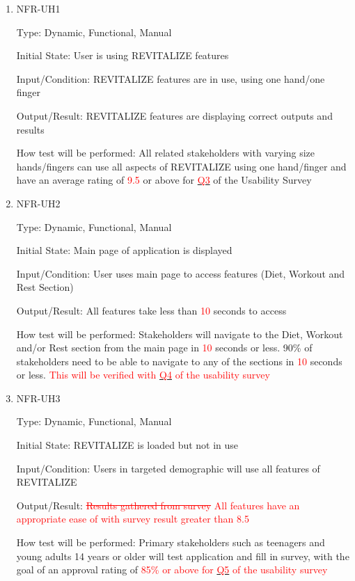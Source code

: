 \documentclass[12pt, titlepage]{article}
\begin{document}
\begin{enumerate}
	
	\item{NFR-UH1\\}
	
	Type: Dynamic, Functional, Manual
	
	Initial State: User is using REVITALIZE features
	
	Input/Condition: REVITALIZE features are in use, using one hand/one finger
	
	Output/Result: REVITALIZE features are displaying correct outputs and results
	
	How test will be performed: All related stakeholders with varying size hands/fingers can use all aspects of REVITALIZE using one hand/finger and have an average rating of \textcolor{red}{9.5} or above for \hyperlink{q3}{\textcolor{red}{Q3}} of the Usability Survey
	
	\item{NFR-UH2\\}
	
	Type: Dynamic, Functional, Manual
	
	Initial State: Main page of application is displayed
	
	Input/Condition: User uses main page to access features (Diet, Workout and Rest Section)
	
	Output/Result: All features take less than \textcolor{red}{10} seconds to access
	
	How test will be performed: Stakeholders will navigate to the Diet, Workout and/or Rest section from the main page in \textcolor{red}{10} seconds or less. 90\% of stakeholders need to be able to navigate to any of the sections in \textcolor{red}{10} seconds or less. \textcolor{red}{This will be verified with \hyperlink{q4}{\textcolor{red}{Q4}} of the usability survey}
	
	\item{NFR-UH3\\}
	
	Type: Dynamic, Functional, Manual
	
	Initial State: REVITALIZE is loaded but not in use
	
	Input/Condition: Users in targeted demographic will use all features of REVITALIZE
	
	Output/Result: \textcolor{red}{\sout{Results gathered from survey}} \textcolor{red}{All features have an appropriate ease of with survey result greater than 8.5}
	
	How test will be performed: Primary stakeholders such as teenagers and young adults 14 years or older will test application and fill in survey, with the goal of an approval rating of \textcolor{red}{85\%} \textcolor{red}{or above for \hyperlink{q5}{\textcolor{red}{Q5}} of the usability survey}
	

\end{enumerate}
\end{document}
